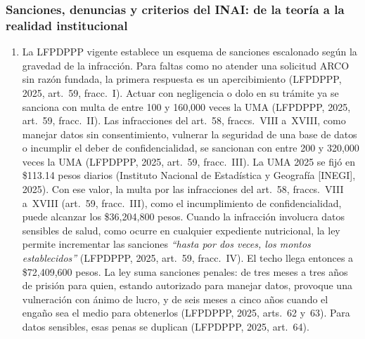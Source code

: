 \documentclass[12pt, a4paper]{article}
\begin{document}
\subsubsection{Sanciones, denuncias y criterios del INAI: de la teoría a la
realidad institucional}
 
\begin{enumerate}[label=\Roman*.]
 
  \item La LFPDPPP vigente establece un esquema de sanciones escalonado
  según la gravedad de la infracción. Para faltas como no atender una
  solicitud ARCO sin razón fundada, la primera respuesta es un
  apercibimiento (LFPDPPP, 2025, art.~59, fracc.~I). Actuar con
  negligencia o dolo en su trámite ya se sanciona con multa de entre 100 y
  160,000 veces la UMA (LFPDPPP, 2025, art.~59, fracc.~II). Las
  infracciones del art.~58, fraccs.~VIII a~XVIII, como manejar datos sin
  consentimiento, vulnerar la seguridad de una base de datos o incumplir
  el deber de confidencialidad, se sancionan con entre 200 y 320,000 veces
  la UMA (LFPDPPP, 2025, art.~59, fracc.~III). La UMA 2025 se fijó en
  \$113.14 pesos diarios (Instituto Nacional de Estadística y Geografía
  [INEGI], 2025). Con ese valor, la multa por las infracciones del
  art.~58, fraccs.~VIII a~XVIII (art.~59, fracc.~III), como el
  incumplimiento de confidencialidad, puede alcanzar los \$36{,}204{,}800
  pesos. Cuando la infracción
  involucra datos sensibles de salud, como ocurre en cualquier
  expediente nutricional, la ley permite incrementar las sanciones
  \textit{``hasta por dos veces, los montos establecidos''} (LFPDPPP,
  2025, art.~59, fracc.~IV).
  El techo llega entonces a \$72{,}409{,}600 pesos. La ley suma
  sanciones penales: de tres meses a tres años de prisión para
  quien, estando autorizado para manejar datos, provoque una
  vulneración con ánimo de lucro, y de seis meses a cinco años
  cuando el engaño sea el medio para obtenerlos (LFPDPPP, 2025,
  arts.~62 y~63). Para datos sensibles, esas penas se duplican
  (LFPDPPP, 2025, art.~64).
 

\end{enumerate}
\end{document}
